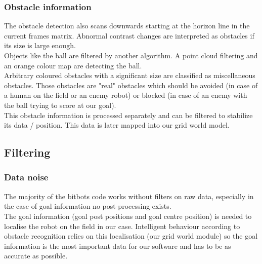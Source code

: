 \documentclass[lnicst,a4paper]{svmultln}
\begin{document}
\subsubsection{Obstacle information}
The obstacle detection also scans downwards starting at the horizon line in the current frames matrix. Abnormal contrast changes are interpreted as obstacles if its size is large enough.
\\
Objects like the ball are filtered by another algorithm. A point cloud filtering and an orange colour map are detecting the ball.
\\
Arbitrary coloured obstacles with a significant size are classified as miscellaneous obstacles. Those obstacles are "real" obstacles which should be avoided (in case of a human on the field or an enemy robot) or blocked (in case of an enemy with the ball trying to score at our goal).
\\
This obstacle information is processed separately and can be filtered to stabilize its data / position. This data is later mapped into our grid world model.





\subsection{Filtering}
\label{sec:solutions_filtering}

\subsubsection{Data noise}


The majority of the bitbots code works without filters on raw data, especially in the case of goal information no post-processing exists.
\\
The goal information (goal post positions and goal centre position) is needed to localise the robot on the field in our case. Intelligent behaviour according to obstacle recognition relies on this localisation (our grid world module) so the goal information is the most important data for our software and has to be as accurate as possible.
\end{document}

